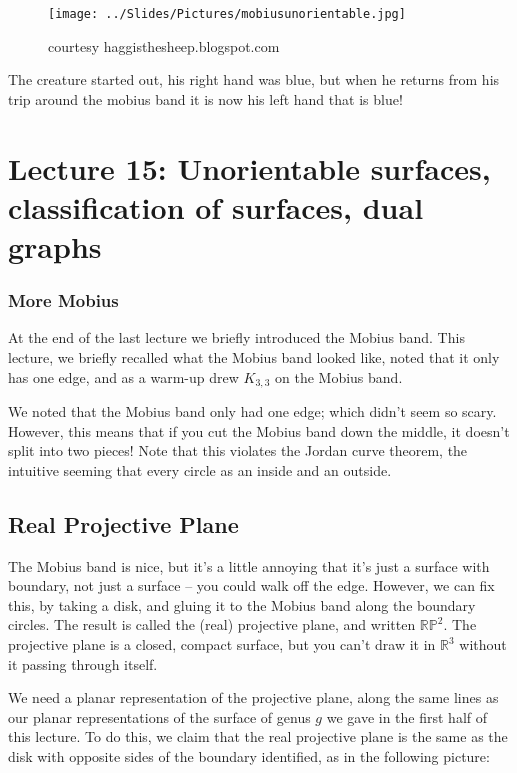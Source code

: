 \documentclass[]{article}
\begin{document}
\begin{figure}[htbp]
\centering
\texttt{[image: ../Slides/Pictures/mobiusunorientable.jpg]}
\caption{courtesy haggisthesheep.blogspot.com}
\end{figure}

The creature started out, his right hand was blue, but when he returns
from his trip around the mobius band it is now his left hand that is
blue!

\section{Lecture 15: Unorientable surfaces, classification of surfaces, dual graphs}

\subsubsection{More Mobius}\label{more-mobius}

At the end of the last lecture we briefly introduced the Mobius band.
This lecture, we briefly recalled what the Mobius band looked like,
noted that it only has one edge, and as a warm-up drew \(K_{3,3}\) on
the Mobius band.

We noted that the Mobius band only had one edge; which didn't seem so
scary. However, this means that if you cut the Mobius band down the
middle, it doesn't split into two pieces! Note that this violates the
Jordan curve theorem, the intuitive seeming that every circle as an
inside and an outside.

\subsection{Real Projective Plane}\label{real-projective-plane}

The Mobius band is nice, but it's a little annoying that it's just a
surface with boundary, not just a surface -- you could walk off the
edge. However, we can fix this, by taking a disk, and gluing it to the
Mobius band along the boundary circles. The result is called the (real)
projective plane, and written \(\mathbb{RP}^2\). The projective plane is
a closed, compact surface, but you can't draw it in \(\mathbb{R}^3\)
without it passing through itself.

We need a planar representation of the projective plane, along the same
lines as our planar representations of the surface of genus \(g\) we
gave in the first half of this lecture. To do this, we claim that the
real projective plane is the same as the disk with opposite sides of the
boundary identified, as in the following picture:
\end{document}
